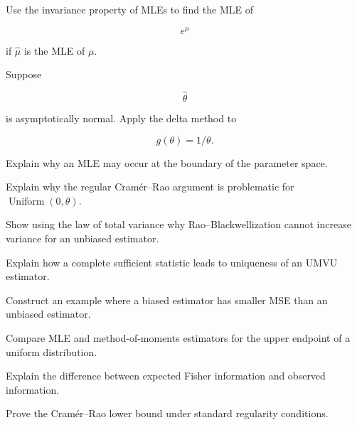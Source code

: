 \begin{exercise}[3]
Use the invariance property of MLEs to find the MLE of

\[
e^\mu
\]

if \(\widehat{\mu}\) is the MLE of \(\mu\).
\end{exercise}

\begin{exercise}[3]
Suppose

\[
\widehat{\theta}
\]

is asymptotically normal. Apply the delta method to

\[
g(\theta)=1/\theta.
\]
\end{exercise}

\begin{exercise}[3]
Explain why an MLE may occur at the boundary of the parameter space.
\end{exercise}

\begin{exercise}[3]
Explain why the regular Cram\'er--Rao argument is problematic for
\(\operatorname{Uniform}(0,\theta)\).
\end{exercise}

\begin{exercise}[3]
Show using the law of total variance why Rao--Blackwellization cannot
increase variance for an unbiased estimator.
\end{exercise}

\begin{exercise}[3]
Explain how a complete sufficient statistic leads to uniqueness of an
UMVU estimator.
\end{exercise}

\begin{exercise}[3]
Construct an example where a biased estimator has smaller MSE than an
unbiased estimator.
\end{exercise}

\begin{exercise}[3]
Compare MLE and method-of-moments estimators for the upper endpoint of a
uniform distribution.
\end{exercise}

\begin{exercise}[3]
Explain the difference between expected Fisher information and observed
information.
\end{exercise}

\begin{exercise}[4]
Prove the Cram\'er--Rao lower bound under standard regularity conditions.
\end{exercise}

